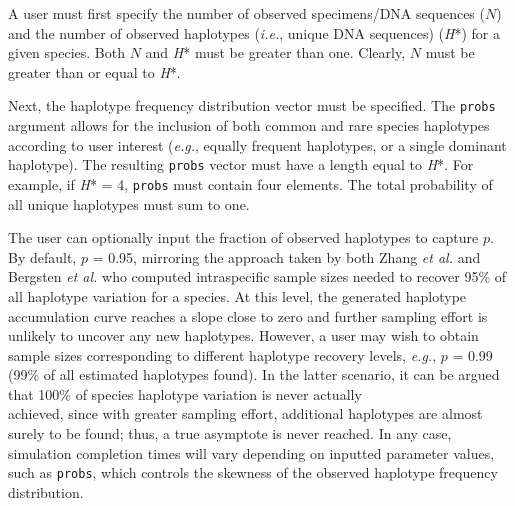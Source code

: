 A user must first specify the number of observed specimens/DNA sequences ($N$) and the number of observed haplotypes (\textit{i.e.}, unique DNA sequences) (\textit{H}*) for a given species. Both $N$ and \textit{H}* must be greater than one. Clearly, $N$ must be greater than or equal to \textit{H}*.

Next, the haplotype frequency distribution vector must be specified. The {\tt probs} \\ argument allows for the inclusion of both common and rare species haplotypes according to user interest (\textit{e.g.}, equally frequent haplotypes, or a single dominant haplotype). The resulting {\tt probs} vector must have a length equal to \textit{H}*. For example, if \textit{H}* = 4, {\tt probs} must contain four elements. The total probability of all unique haplotypes must sum to one.

The user can optionally input the fraction of observed haplotypes to capture $p$. By default, $p$ = 0.95, mirroring the approach taken by both Zhang \textit{et al.} \cite{zhang2010estimating} and Bergsten \textit{et al.} \cite{bergsten2012effect} who computed intraspecific sample sizes needed to recover 95\% of all haplotype variation for a species. At this level, the generated haplotype accumulation curve reaches a slope close to zero and further sampling effort is unlikely to uncover any new haplotypes. However, a user may wish to obtain sample sizes corresponding to different haplotype recovery levels, \textit{e.g.}, $p$ = 0.99 (99\% of all estimated haplotypes found). In the latter scenario, it can be argued that 100\% of species haplotype variation is never actually \\ achieved, since with greater sampling effort, additional haplotypes are almost surely to be found; thus, a true asymptote is never reached. In any case, simulation completion times will vary depending on inputted parameter values, such as {\tt probs}, which controls the skewness of the observed haplotype frequency distribution. 


